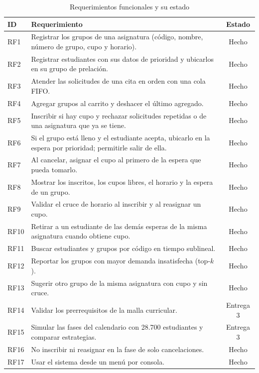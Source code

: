 \documentclass[conference]{IEEEtran}
\begin{document}
\begin{table}[htbp]
\caption{Requerimientos funcionales y su estado}
\label{tab:rf}
\centering
\footnotesize
\begin{tabular}{@{}l p{5.0cm} c@{}}
\toprule
\textbf{ID} & \textbf{Requerimiento} & \textbf{Estado} \\
\midrule
RF1 & Registrar los grupos de una asignatura (código, nombre, número de grupo, cupo y horario). & Hecho \\
RF2 & Registrar estudiantes con sus datos de prioridad y ubicarlos en su grupo de prelación. & Hecho \\
RF3 & Atender las solicitudes de una cita en orden con una cola FIFO. & Hecho \\
RF4 & Agregar grupos al carrito y deshacer el último agregado. & Hecho \\
RF5 & Inscribir si hay cupo y rechazar solicitudes repetidas o de una asignatura que ya se tiene. & Hecho \\
RF6 & Si el grupo está lleno y el estudiante acepta, ubicarlo en la espera por prioridad; permitirle salir de ella. & Hecho \\
RF7 & Al cancelar, asignar el cupo al primero de la espera que pueda tomarlo. & Hecho \\
RF8 & Mostrar los inscritos, los cupos libres, el horario y la espera de un grupo. & Hecho \\
RF9 & Validar el cruce de horario al inscribir y al reasignar un cupo. & Hecho \\
RF10 & Retirar a un estudiante de las demás esperas de la misma asignatura cuando obtiene cupo. & Hecho \\
RF11 & Buscar estudiantes y grupos por código en tiempo sublineal. & Hecho \\
RF12 & Reportar los grupos con mayor demanda insatisfecha (top-$k$). & Hecho \\
RF13 & Sugerir otro grupo de la misma asignatura con cupo y sin cruce. & Hecho \\
RF14 & Validar los prerrequisitos de la malla curricular. & Entrega 3 \\
RF15 & Simular las fases del calendario con 28.700 estudiantes y comparar estrategias. & Entrega 3 \\
RF16 & No inscribir ni reasignar en la fase de solo cancelaciones. & Hecho \\
RF17 & Usar el sistema desde un menú por consola. & Hecho \\
\bottomrule
\end{tabular}
\end{table}
\end{document}
